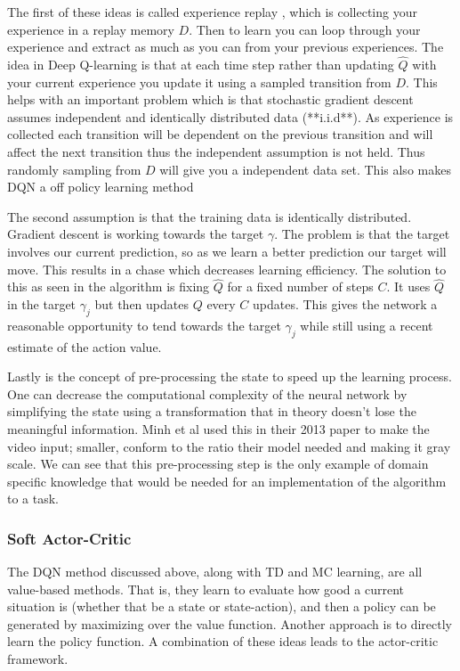 The first of these ideas is called experience replay \cite{10.5555/168871}, which is collecting your experience in a replay memory $D$. Then to learn you can loop through your experience and extract as much as you can from your previous experiences. The idea in Deep Q-learning is that at each time step rather than updating $\hat{Q}$ with your current experience you update it using a sampled transition from $D$. This helps with an important problem which is that stochastic gradient descent assumes independent and identically distributed data (**i.i.d**). As experience is collected each transition will be dependent on the previous transition and will affect the next transition thus the independent assumption is not held. Thus randomly sampling from $D$ will give you a independent data set. This also makes DQN a off policy learning method

The second assumption is that the training data is identically distributed. Gradient descent is working towards the target $\gamma$. The problem is that the target involves our current prediction, so as we learn a better prediction our target will move. This results in a chase which decreases learning efficiency. The solution to this as seen in the algorithm is fixing $\hat{Q}$ for a fixed number of steps $C$. It uses $\hat{Q}$ in the target $\gamma_{j}$ but then updates $Q$ every $C$ updates. This gives the network a reasonable opportunity to tend towards the target $\gamma_{j}$ while still using a recent estimate of the action value.

Lastly is the concept of pre-processing the state to speed up the learning process. One can decrease the computational complexity of the neural network by simplifying the state using a transformation that in theory doesn't lose the meaningful information. Minh et al used this in their 2013 paper to make the video input; smaller, conform to the ratio their model needed and making it gray scale. We can see that this pre-processing step is the only example of domain specific knowledge that would be needed for an implementation of the algorithm to a task.

\subsubsection{Soft Actor-Critic}\label{subsec:SAC}

The DQN method discussed above, along with TD and MC learning, are all value-based methods. That is, they learn to evaluate how good a current situation is (whether that be a state or state-action), and then a policy can be generated by maximizing over the value function. Another approach is to directly learn the policy function. A combination of these ideas leads to the actor-critic framework.

